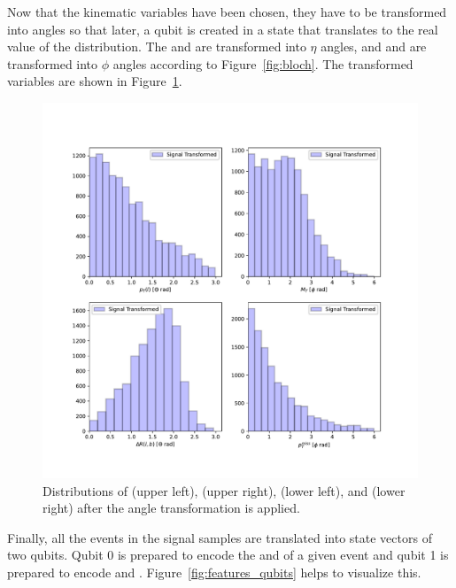 Now that the kinematic variables have been chosen, they have to be transformed
into angles so that later, a qubit is created in a state that translates to the
real value of the distribution. The \ptl and \drLB are transformed into $\eta$
angles, and \mt and \ptmiss are transformed into $\phi$ angles according to 
Figure~\ref{fig:bloch}. The transformed variables are shown in 
Figure~\ref{fig:features_transformed}.

\begin{figure}[!htbp]
\centering
    \includegraphics[width=1\textwidth]{figures/features_transformed.pdf}
\caption{Distributions of \ptl (upper left), \mt (upper right), \drLB 
    (lower left), and \ptmiss (lower right) after the angle transformation is 
    applied.}
\label{fig:features_transformed}
\end{figure}

Finally, all the events in the signal samples are translated into state vectors
of two qubits. Qubit 0 is prepared to encode the \ptl and \mt of a given
event and qubit 1 is prepared to encode \drLB and \ptmiss. 
Figure~\ref{fig:features_qubits} helps to visualize this.

